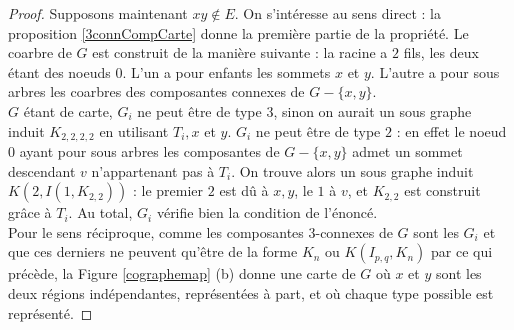 \documentclass{scrartcl}
\begin{document}
\begin{flushleft}
\begin{proof}
    Supposons maintenant $xy \notin E$. On s'intéresse au sens direct : la proposition \ref{3connCompCarte} donne la première partie de la propriété.
    Le coarbre de $G$ est construit de la manière suivante : la racine a $2$ fils, les deux étant des noeuds $0$. L'un a pour enfants les sommets $x$
    et $y$. L'autre a pour sous arbres les coarbres des composantes connexes de $G - \{x,y\}$.\\
    $G$ étant de carte, $G_i$ ne peut être de type $3$, sinon on aurait un sous graphe induit $K_{2,2,2,2}$ en utilisant $T_i, x$ et $y$.
    $G_i$ ne peut être de type $2$ : en effet le noeud $0$ ayant pour sous arbres les composantes de $G - \{x,y\}$ admet un sommet descendant
    $v$ n'appartenant pas à $T_i$. On trouve alors un sous graphe induit $K(2, I(1, K_{2,2}))$ : le premier $2$ est dû à $x,y$, le $1$ à $v$,
    et $K_{2,2}$ est construit grâce à $T_i$. Au total, $G_i$ vérifie bien la condition de l'énoncé.\\
    Pour le sens réciproque, comme les composantes $3$-connexes de $G$ sont les $G_i$ et que ces derniers ne peuvent qu'être de la forme
    $K_n$ ou $K(I_{p,q}, K_n)$ par ce qui précède, la Figure \ref{cographemap} (b) donne une carte de $G$ où $x$ et $y$ sont les deux régions indépendantes,
    représentées à part, et où chaque type possible est représenté.
\end{proof}


\end{flushleft}
\end{document}
